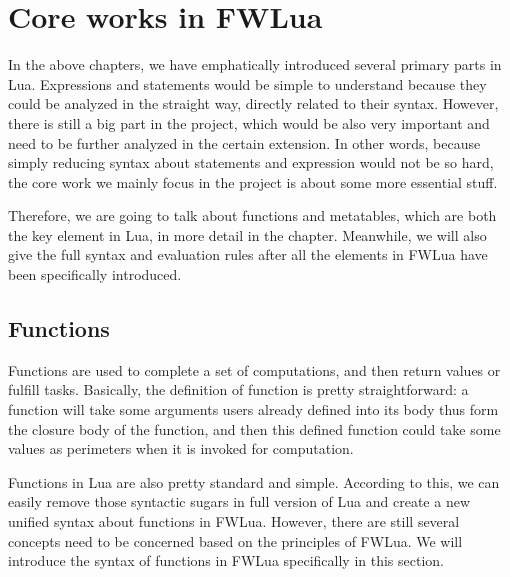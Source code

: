\chapter{Core works in FWLua}
In the above chapters, we have emphatically introduced several primary parts in Lua. Expressions and statements would be simple to understand because they could be analyzed in the straight way, directly related to their syntax. However, there is still a big part in the project, which would be also very important and need to be further analyzed in the certain extension. In other words, because simply reducing syntax about statements and expression would not be so hard, the core work we mainly focus in the project is about some more essential stuff.

Therefore, we are going to talk about functions and metatables, which are both the key element in Lua, in more detail in the chapter. Meanwhile, we will also give the full syntax and evaluation rules after all the elements in FWLua have been specifically introduced.


\section{Functions}
Functions are used to complete a set of computations, and then return values or fulfill tasks. Basically, the definition of function is pretty straightforward: a function will take some arguments users already defined into its body thus form the closure body of the function, and then this defined function could take some values as perimeters when it is invoked for computation.

Functions in Lua are also pretty standard and simple. According to this, we can easily remove those syntactic sugars in full version of Lua and create a new unified syntax about functions in FWLua. However, there are still several concepts need to be concerned based on the principles of FWLua. We will introduce the syntax of functions in FWLua specifically in this section.

